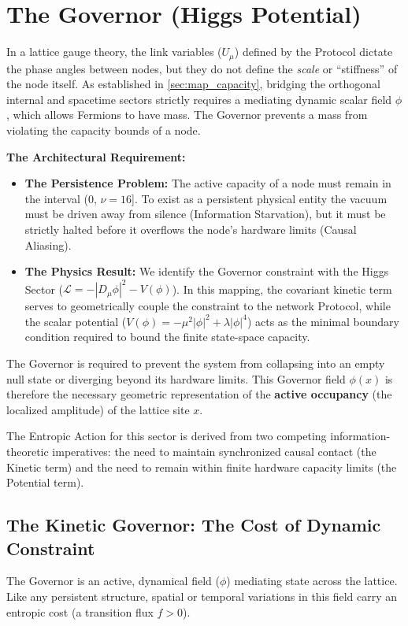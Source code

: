 \section{The Governor (Higgs Potential)}
\label{sec:governor}

In a lattice gauge theory, the link variables ($U_\mu$) defined by the Protocol dictate the phase angles between nodes, but they do not define the \textit{scale} or ``stiffness'' of the node itself. As established in \cref{sec:map_capacity}, bridging the orthogonal internal and spacetime sectors strictly requires a mediating dynamic scalar field $\phi$, which allows Fermions to have mass. The Governor prevents a mass from violating the capacity bounds of a node.

\textbf{The Architectural Requirement:}
\begin{itemize}
    \item \textbf{The Persistence Problem:} The active capacity of a node must remain in the interval (0, $\nu=16$]. To exist as a persistent physical entity the vacuum must be driven away from silence (Information Starvation), but it must be strictly halted before it overflows the node's hardware limits (Causal Aliasing).
    \item \textbf{The Physics Result:} We identify the Governor constraint with the Higgs Sector ($\mathcal{L} = -|D_\mu\phi|^2 - V(\phi)$). In this mapping, the covariant kinetic term serves to geometrically couple the constraint to the network Protocol, while the scalar potential ($V(\phi) = -\mu^2|\phi|^2 + \lambda|\phi|^4$) acts as the minimal boundary condition required to bound the finite state-space capacity.
\end{itemize}

The Governor is required to prevent the system from collapsing into an empty null state or diverging beyond its hardware limits. This Governor field $\phi(x)$ is therefore the necessary geometric representation of the \textbf{active occupancy} (the localized amplitude) of the lattice site $x$.

The Entropic Action for this sector is derived from two competing information-theoretic imperatives: the need to maintain synchronized causal contact (the Kinetic term) and the need to remain within finite hardware capacity limits (the Potential term).

\subsection{The Kinetic Governor: The Cost of Dynamic Constraint}
The Governor is an active, dynamical field ($\phi$) mediating state across the lattice. Like any persistent structure, spatial or temporal variations in this field carry an entropic cost (a transition flux $f > 0$).

